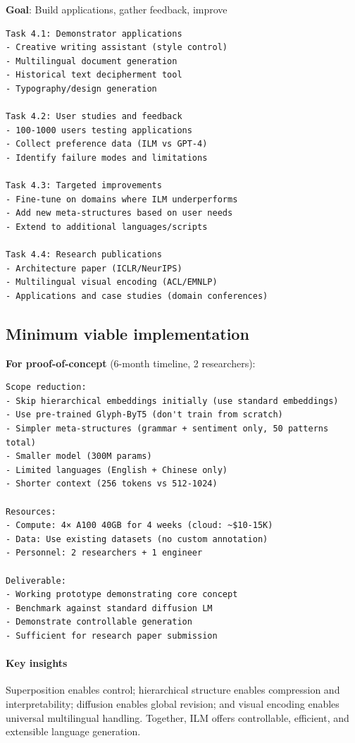 \documentclass[11pt]{article}
\begin{document}
\textbf{Goal}: Build applications, gather feedback, improve

\begin{verbatim}
Task 4.1: Demonstrator applications
- Creative writing assistant (style control)
- Multilingual document generation
- Historical text decipherment tool
- Typography/design generation

Task 4.2: User studies and feedback
- 100-1000 users testing applications
- Collect preference data (ILM vs GPT-4)
- Identify failure modes and limitations

Task 4.3: Targeted improvements
- Fine-tune on domains where ILM underperforms
- Add new meta-structures based on user needs
- Extend to additional languages/scripts

Task 4.4: Research publications
- Architecture paper (ICLR/NeurIPS)
- Multilingual visual encoding (ACL/EMNLP)
- Applications and case studies (domain conferences)
\end{verbatim}

\subsection{Minimum viable implementation}

\textbf{For proof-of-concept} (6-month timeline, 2 researchers):

\begin{verbatim}
Scope reduction:
- Skip hierarchical embeddings initially (use standard embeddings)
- Use pre-trained Glyph-ByT5 (don't train from scratch)
- Simpler meta-structures (grammar + sentiment only, 50 patterns total)
- Smaller model (300M params)
- Limited languages (English + Chinese only)
- Shorter context (256 tokens vs 512-1024)

Resources:
- Compute: 4× A100 40GB for 4 weeks (cloud: ~$10-15K)
- Data: Use existing datasets (no custom annotation)
- Personnel: 2 researchers + 1 engineer

Deliverable:
- Working prototype demonstrating core concept
- Benchmark against standard diffusion LM
- Demonstrate controllable generation
- Sufficient for research paper submission
\end{verbatim}

\paragraph{Key insights} Superposition enables control; hierarchical structure enables compression and interpretability; diffusion enables global revision; and visual encoding enables universal multilingual handling. Together, ILM offers controllable, efficient, and extensible language generation.
\end{document}
